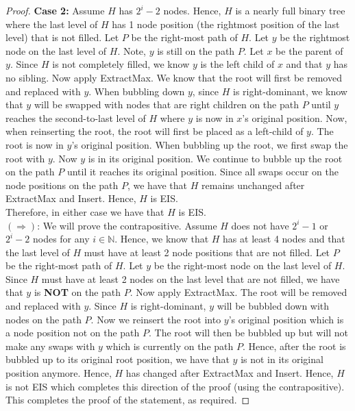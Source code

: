 \documentclass[12pt]{article}
\newcommand{\N}{\mathbb{N}}
\begin{document}
\begin{proof}
\textbf{Case 2:} Assume $H$ has $2^i - 2$ nodes. Hence, $H$ is a nearly full binary tree where the last level of $H$ has 1 node position (the rightmost position of the last level) that is not filled. Let $P$ be the right-most path of $H$. Let $y$ be the rightmost node on the last level of $H$. Note, $y$ is still on the path $P$. Let $x$ be the parent of $y$. Since $H$ is not completely filled, we know $y$ is the left child of $x$ and that $y$ has no sibling. Now apply ExtractMax. We know that the root will first be removed and replaced with $y$. When bubbling down $y$, since $H$ is right-dominant, we know that $y$ will be swapped with nodes that are right children on the path $P$ until $y$ reaches the second-to-last level of $H$ where $y$ is now in $x$'s original position. Now, when reinserting the root, the root will first be placed as a left-child of $y$. The root is now in $y$'s original position. When bubbling up the root, we first swap the root with $y$. Now $y$ is in its original position. We continue to bubble up the root on the path $P$ until it reaches its original position. Since all swaps occur on the node positions on the path $P$, we have that $H$ remains unchanged after ExtractMax and Insert. Hence, $H$ is EIS. \\ 

Therefore, in either case we have that $H$ is EIS. \\

$(\Rightarrow)$: We will prove the contrapositive. Assume $H$ does not have $2^i - 1$ or $2^i - 2$ nodes for any $i \in \N$. Hence, we know that $H$ has at least 4 nodes and that the last level of $H$ must have at least 2 node positions that are not filled. Let $P$ be the right-most path of $H$. Let $y$ be the right-most node on the last level of $H$. Since $H$ must have at least 2 nodes on the last level that are not filled, we have that $y$ is \textbf{NOT} on the path $P$. Now apply ExtractMax. The root will be removed and replaced with $y$. Since $H$ is right-dominant, $y$ will be bubbled down with nodes on the path $P$. Now we reinsert the root into $y$'s original position which is a node position not on the path $P$. The root will then be bubbled up but will not make any swaps with $y$ which is currently on the path $P$. Hence, after the root is bubbled up to its original root position, we have that $y$ is not in its original position anymore. Hence, $H$ has changed after ExtractMax and Insert. Hence, $H$ is not EIS which completes this direction of the proof (using the contrapositive). \\

This completes the proof of the statement, as required. 
\end{proof}
\end{document}
